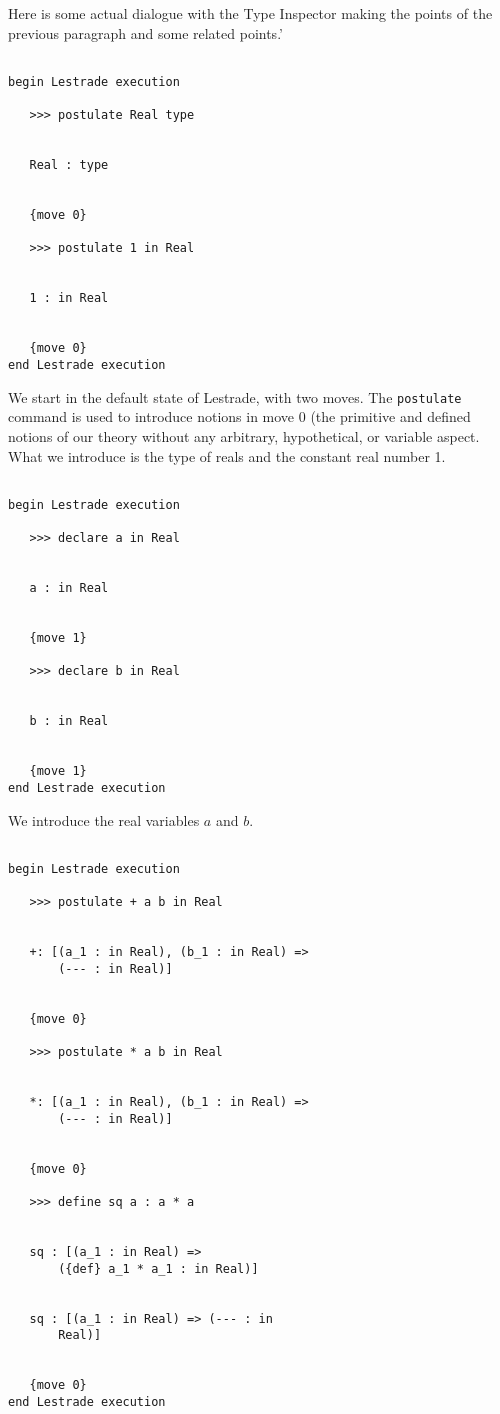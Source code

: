\documentclass[12pt]{article}
\begin{document}
Here is some actual dialogue with the Type Inspector making the points of the previous paragraph and some related points.'

\begin{verbatim}

begin Lestrade execution

   >>> postulate Real type


   Real : type


   {move 0}

   >>> postulate 1 in Real


   1 : in Real


   {move 0}
end Lestrade execution

\end{verbatim}

We start in the default state of Lestrade, with two moves.  The {\tt postulate} command is used to introduce notions in move 0
(the primitive and defined notions of our theory without any arbitrary, hypothetical, or variable aspect.  What we introduce is the type of reals
and the constant real number 1.

\begin{verbatim}

begin Lestrade execution

   >>> declare a in Real


   a : in Real


   {move 1}

   >>> declare b in Real


   b : in Real


   {move 1}
end Lestrade execution

\end{verbatim}

We introduce the real variables $a$ and $b$.

\begin{verbatim}

begin Lestrade execution

   >>> postulate + a b in Real


   +: [(a_1 : in Real), (b_1 : in Real) => 
       (--- : in Real)]


   {move 0}

   >>> postulate * a b in Real


   *: [(a_1 : in Real), (b_1 : in Real) => 
       (--- : in Real)]


   {move 0}

   >>> define sq a : a * a


   sq : [(a_1 : in Real) => 
       ({def} a_1 * a_1 : in Real)]


   sq : [(a_1 : in Real) => (--- : in 
       Real)]


   {move 0}
end Lestrade execution

\end{verbatim}
\end{document}
